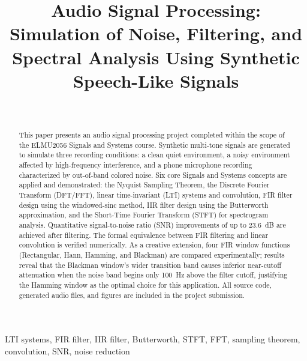 \documentclass[journal]{IEEEtran}
\begin{document}
\title{Audio Signal Processing: Simulation of Noise, Filtering, and Spectral Analysis
       Using Synthetic Speech-Like Signals}

\author{%
  \\
}

\maketitle

\begin{abstract}
This paper presents an audio signal processing project completed within the scope
of the ELMU2056 Signals and Systems course. Synthetic multi-tone signals are
generated to simulate three recording conditions: a clean quiet environment, a
noisy environment affected by high-frequency interference, and a phone microphone
recording characterized by out-of-band colored noise. Six core Signals and Systems
concepts are applied and demonstrated: the Nyquist Sampling Theorem, the Discrete
Fourier Transform (DFT/FFT), linear time-invariant (LTI) systems and convolution,
FIR filter design using the windowed-sinc method, IIR filter design using the
Butterworth approximation, and the Short-Time Fourier Transform (STFT) for
spectrogram analysis. Quantitative signal-to-noise ratio (SNR) improvements of
up to 23.6~dB are achieved after filtering. The formal equivalence between FIR
filtering and linear convolution is verified numerically. As a creative extension,
four FIR window functions (Rectangular, Hann, Hamming, and Blackman) are compared
experimentally; results reveal that the Blackman window's wider transition band
causes inferior near-cutoff attenuation when the noise band begins only 100~Hz
above the filter cutoff, justifying the Hamming window as the optimal choice for
this application. All source code, generated audio files, and figures are included
in the project submission.
\end{abstract}

\begin{IEEEkeywords}
LTI systems, FIR filter, IIR filter, Butterworth, STFT, FFT, sampling theorem,
convolution, SNR, noise reduction
\end{IEEEkeywords}
\end{document}
